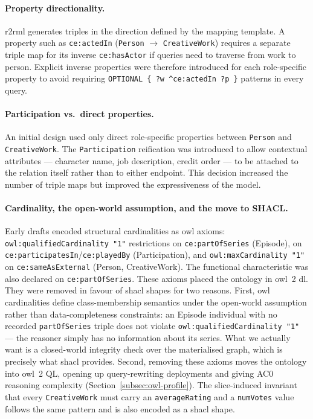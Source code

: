 \paragraph{Property directionality.}
\ac{r2rml} generates triples in the direction defined by the mapping template. A property such as \texttt{ce:actedIn} (\texttt{Person} $\to$ \texttt{CreativeWork}) requires a separate triple map for its inverse \texttt{ce:hasActor} if queries need to traverse from work to person. Explicit inverse properties were therefore introduced for each role-specific property to avoid requiring \texttt{OPTIONAL \{ ?w \^{}ce:actedIn ?p \}} patterns in every query.

\paragraph{Participation vs.\ direct properties.}
An initial design used only direct role-specific properties between \texttt{Person} and \texttt{CreativeWork}. The \texttt{Participation} reification was introduced to allow contextual attributes --- character name, job description, credit order --- to be attached to the relation itself rather than to either endpoint. This decision increased the number of triple maps but improved the expressiveness of the model.

\paragraph{Cardinality, the open-world assumption, and the move to SHACL.}
Early drafts encoded structural cardinalities as \ac{owl} axioms: \texttt{owl:qualifiedCardinality "1"} restrictions on \texttt{ce:partOfSeries} (Episode), on \texttt{ce:participatesIn}/\texttt{ce:playedBy} (Participation), and \texttt{owl:maxCardinality "1"} on \texttt{ce:sameAsExternal} (Person, CreativeWork). The functional characteristic was also declared on \texttt{ce:partOfSeries}. These axioms placed the ontology in \ac{owl}~2 \ac{dl}. They were removed in favour of \ac{shacl} shapes for two reasons. First, \ac{owl} cardinalities define class-membership semantics under the open-world assumption rather than data-completeness constraints: an Episode individual with no recorded \texttt{partOfSeries} triple does not violate \texttt{owl:qualifiedCardinality "1"} --- the reasoner simply has no information about its series. What we actually want is a closed-world integrity check over the materialised graph, which is precisely what \ac{shacl} provides. Second, removing these axioms moves the ontology into \ac{owl}~2 QL, opening up query-rewriting deployments and giving AC0 reasoning complexity (Section~\ref{subsec:owl-profile}). The slice-induced invariant that every \texttt{CreativeWork} must carry an \texttt{averageRating} and a \texttt{numVotes} value follows the same pattern and is also encoded as a \ac{shacl} shape.

